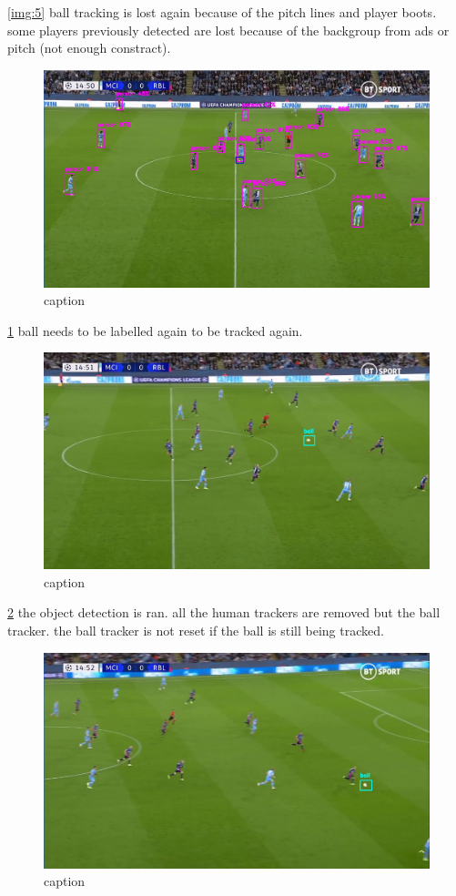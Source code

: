 \documentclass[
11pt,
twoside
]{report}
\begin{document}
\ref{img:5} ball
tracking is lost again because of the pitch lines and player boots. some players previously detected are lost because of the backgroup from ads or pitch (not enough constract).
\begin{figure}[H]
    \includegraphics[keepaspectratio, width=\columnwidth]{Screenshot_2022-03-03_21-36-47.png}
    \caption{caption}
    \label{img:6}
\end{figure}
\ref{img:6} ball needs
to be labelled again to be tracked again.
\begin{figure}[H]
    \includegraphics[keepaspectratio, width=\columnwidth]{Screenshot_2022-03-03_23-05-49.png}
    \caption{caption}
    \label{img:7}
\end{figure}
\ref{img:7} the object
detection is ran. all the human trackers are removed but the ball tracker. the ball tracker is not reset if the ball is still being tracked.
\begin{figure}[H]
    \includegraphics[keepaspectratio, width=\columnwidth]{Screenshot_2022-03-03_23-06-03.png}
    \caption{caption}
    \label{img:8}
\end{figure}
\end{document}

